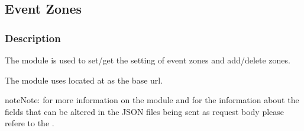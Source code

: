\documentclass[letterpaper,10pt,english]{sphinxmanual}
\begin{document}

\begin{fulllineitems}
\label{\detokenize{gemini_perception_API:gemini_perception_API.set_underlay_map}}
\pysigstartsignatures
{}
\pysigstopsignatures
\end{fulllineitems}


\sphinxstepscope


\subsection{Event Zones}
\label{\detokenize{gemini_event_zone_API:event-zones}}\label{\detokenize{gemini_event_zone_API::doc}}

\subsubsection{Description}
\label{\detokenize{gemini_event_zone_API:description}}
\sphinxAtStartPar
The module is used to set/get the setting of event zones and add/delete zones.

\sphinxAtStartPar
The module uses  located at {\hyperref[\detokenize{gemini_login::doc}]{}} as the base url.

\begin{sphinxadmonition}{note}{Note:}
\sphinxAtStartPar
for more information on the module and for the information about the fields that can be altered in the
JSON files being sent as request body please refere to the .
\end{sphinxadmonition}
\label{\detokenize{gemini_event_zone_API:module-gemini_event_zone_API}}
\end{document}
